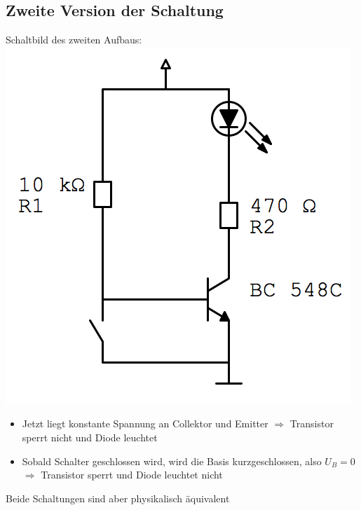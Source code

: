 \documentclass[compress,11pt]{beamer}
\begin{document}
\subsection{Zweite Version der Schaltung}
\begin{frame}
Schaltbild des zweiten Aufbaus:\\
\includegraphics[width=.7\textwidth]{schaltbilder/21}\\

\end{frame}
\begin{frame}
\begin{itemize}
\item Jetzt liegt konstante Spannung an Collektor und Emitter $\Rightarrow$ Transistor sperrt nicht und Diode leuchtet
\item Sobald Schalter geschlossen wird, wird die Basis kurzgeschlossen, also $U_B = 0$ $\Rightarrow$ Transistor sperrt und Diode leuchtet nicht
\end{itemize}
Beide Schaltungen sind aber physikalisch äquivalent
\end{frame}
\end{document}
